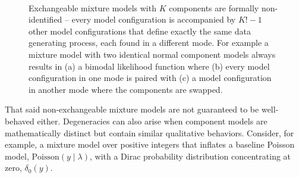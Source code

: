 \documentclass[
  letterpaper,
  DIV=11,
  numbers=noendperiod]{scrartcl}
\begin{document}
\begin{figure}
\begin{minipage}{0.45\linewidth}
{}

\subcaption{\label{fig-label-switching-1}}

\end{minipage}%
%
\begin{minipage}{0.45\linewidth}


\subcaption{\label{fig-label-switching-2}}

\end{minipage}%
%
\begin{minipage}{0.05\linewidth}
~\end{minipage}%

\caption{\label{fig-label-switching}Exchangeable mixture models with
\(K\) components are formally non-identified -- every model
configuration is accompanied by \(K! - 1\) other model configurations
that define exactly the same data generating process, each found in a
different mode. For example a mixture model with two identical normal
component models always results in (a) a bimodal likelihood function
where (b) every model configuration in one mode is paired with (c) a
model configuration in another mode where the components are swapped.}

\end{figure}%

That said non-exchangeable mixture models are not guaranteed to be
well-behaved either. Degeneracies can also arise when component models
are mathematically distinct but contain similar qualitative behaviors.
Consider, for example, a mixture model over positive integers that
inflates a baseline Poisson model, \(\mathrm{Poisson}(y \mid \lambda)\),
with a Dirac probability distribution concentrating at zero,
\(\delta_{0}(y)\).
\end{document}
